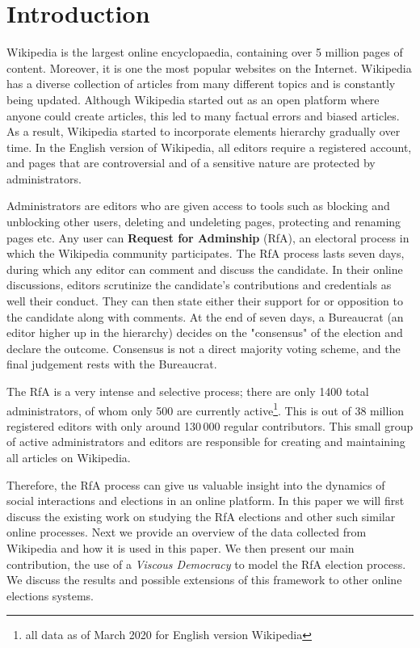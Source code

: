 \section{Introduction}
\label{sec:introduction}

Wikipedia is the largest online encyclopaedia, containing over 5 million pages of content. Moreover, it is one the most popular websites on the Internet. Wikipedia has a diverse collection of articles from many different topics and is constantly being updated. Although Wikipedia started out as an open platform where anyone could create articles, this led to many factual errors and biased articles. As a result, Wikipedia started to incorporate elements hierarchy gradually over time. In the English version of Wikipedia, all editors require a registered account, and pages that are controversial and of a sensitive nature are protected by administrators.

Administrators are editors who are given access to tools such as blocking and unblocking other users, deleting and undeleting pages, protecting and renaming pages etc. Any user can \textbf{Request for Adminship} (RfA), an electoral process in which the Wikipedia community participates. The RfA process lasts seven days, during which any editor can comment and discuss the candidate. In their online discussions, editors scrutinize the candidate's contributions and credentials as well their conduct. They can then state either their support for or opposition to the candidate along with comments. At the end of seven days, a Bureaucrat (an editor higher up in the hierarchy) decides on the "consensus" of the election and declare the outcome. Consensus is not a direct majority voting scheme, and the final judgement rests with the Bureaucrat.

The RfA is a very intense and selective process; there are only 1400 total administrators, of whom only 500 are currently active\footnote{all data as of March 2020 for English version Wikipedia}. This is out of 38 million registered editors with only around 130\,000 regular contributors. This small group of active administrators and editors are responsible for creating and maintaining all articles on Wikipedia.

Therefore, the RfA process can give us valuable insight into the dynamics of social interactions and elections in an online platform. In this paper we will first discuss the existing work on studying the RfA elections and other such similar online processes. Next we provide an overview of the data collected from Wikipedia and how it is used in this paper. We then present our main contribution, the use of a \textit{Viscous Democracy} to model the RfA election process. We discuss the results and possible extensions of this framework to other online elections systems.  
